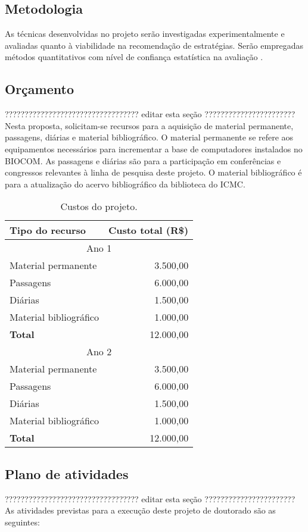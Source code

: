 \subsection{Metodologia}
As técnicas desenvolvidas no projeto serão investigadas
experimentalmente e avaliadas quanto à viabilidade na recomendação
de estratégias.
Serão empregadas métodos quantitativos com nível de confiança estatística
na avaliação \citep{Bishop2006}.

\subsection{Orçamento}
??????????????????????????????????
editar esta seção
???????????????????????
Nesta proposta, solicitam-se recursos para a aquisição de material permanente,
passagens, diárias e material bibliográfico.
O material permanente se refere aos equipamentos necessários para incrementar a
base de computadores instalados no BIOCOM. As passagens e diárias são para a
participação em conferências e congressos relevantes à linha de pesquisa deste projeto.
O material bibliográfico é para a atualização do acervo bibliográfico da biblioteca do
ICMC.

\begin{table}[!htp]
\centering
\begin{tabular}{|lr|}
\hline
\textbf{Tipo do recurso} & \textbf{Custo total (R\$)} \\
\hline
\multicolumn{2}{|c|}{Ano 1} \\
\hline
Material permanente & 3.500,00 \\
Passagens           & 6.000,00 \\
Diárias             & 1.500,00 \\
Material bibliográfico & 1.000,00 \\
\textbf{Total} & 12.000,00 \\
\hline
\multicolumn{2}{|c|}{Ano 2} \\
\hline
Material permanente & 3.500,00 \\
Passagens           & 6.000,00 \\
Diárias             & 1.500,00 \\
Material bibliográfico & 1.000,00 \\
\textbf{Total} & 12.000,00 \\
\hline
\end{tabular}
\caption{Custos do projeto.}
\end{table}

\subsection{Plano de atividades}
??????????????????????????????????
editar esta seção
???????????????????????
As atividades previstas para a execução deste projeto de doutorado são as seguintes:

